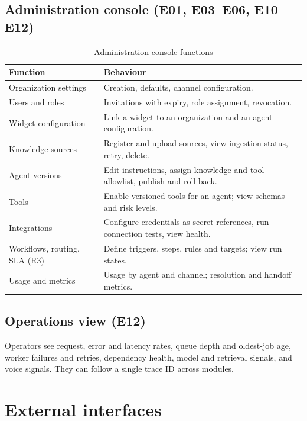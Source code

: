 \subsection{Administration console (E01, E03--E06, E10--E12)}
\begin{table}[htbp]
\centering\caption{Administration console functions}\label{tab:admin}
\begin{tabular}{@{}p{4.2cm}p{11.8cm}@{}}
\toprule \textbf{Function} & \textbf{Behaviour} \\ \midrule
Organization settings & Creation, defaults, channel configuration. \\
Users and roles & Invitations with expiry, role assignment, revocation. \\
Widget configuration & Link a widget to an organization and an agent configuration. \\
Knowledge sources & Register and upload sources, view ingestion status, retry, delete. \\
Agent versions & Edit instructions, assign knowledge and tool allowlist, publish and roll back. \\
Tools & Enable versioned tools for an agent; view schemas and risk levels. \\
Integrations & Configure credentials as secret references, run connection tests, view health. \\
Workflows, routing, SLA (R3) & Define triggers, steps, rules and targets; view run states. \\
Usage and metrics & Usage by agent and channel; resolution and handoff metrics. \\
\bottomrule
\end{tabular}
\end{table}

\subsection{Operations view (E12)}
Operators see request, error and latency rates, queue depth and oldest-job age, worker failures and retries, dependency health, model and retrieval signals, and voice signals. They can follow a single trace ID across modules.

\section{External interfaces}
